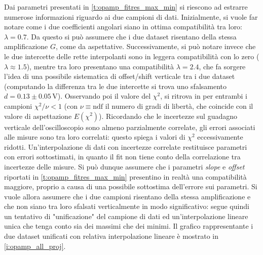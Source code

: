 \documentclass[a4paper,11pt]{article} %
\begin{document}
\noindent Dai parametri presentati in  \autoref{t:opamp_fitres_max_min} si riescono ad estrarre numerose informazioni
riguardo ai due campioni di dati. Inizialmente, si vuole far notare come i due coefficienti angolari siano in ottima
compatibilità tra loro: $\lambda=0.7$. Da questo si può assumere che i due dataset risentano della stessa amplificazione
$G$, come da aspettative. Successivamente, si può notare invece che le due intercette delle rette interpolanti sono in
leggera compatibilità con lo zero ($\lambda \approx 1.5$), mentre tra loro presentano una compatibilità $\lambda=2.4$,
che fa sorgere l'idea di una possibile sistematica di offset/shift verticale tra i due dataset (computando la differenza tra le
due intercette si trova uno sfalsamento $d=0.13 \pm 0.05 \,\si{\volt}$). Osservando poi il valore del $\chi^2$, si
ritrova in per entrambi i campioni $\chi^2/\nu<1$ (con $\nu\equiv\text{ndf}$ il numero di gradi di libertà, che coincide
con il valore di aspettazione $E(\chi^2)$). Ricordando che le incertezze sul guadagno verticale dell'oscilloscopio sono
almeno parzialmente correlate, gli errori associati alle misure sono tra loro correlati: questo spiega i valori di
$\chi^2$ eccessivamente ridotti. Un'interpolazione di dati con incertezze correlate restituisce parametri con errori
sottostimati, in quanto il fit non tiene conto della correlazione tra incertezze delle misure. Si può dunque assumere
che i parametri \textit{slope} e \textit{offset} riportati in \autoref{t:opamp_fitres_max_min} presentino in realtà una
compatibilità maggiore, proprio a causa di una possibile sottostima dell'errore sui parametri. Si vuole allora assumere
che i due campioni risentano della stessa amplificazione e che non siano tra loro sfalsati verticalmente in modo
significativo: segue quindi un tentativo di "unificazione" del campione di dati ed un'interpolazione lineare unica che
tenga conto sia dei massimi che dei minimi. Il grafico rappresentante i due dataset unificati con relativa
interpolazione lineare è mostrato in \autoref{i:opamp_all_proj}. 
\end{document}
